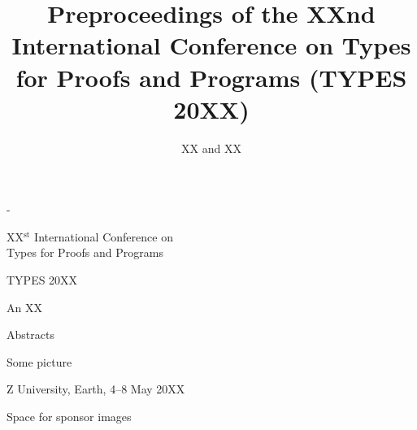 \documentclass[a4paper,extrafontsizes,oneside]{memoir}
\title{Preproceedings of the XXnd International Conference on Types for Proofs and Programs (TYPES 20XX)}
\author{XX and XX}
\begin{document}
\hypersetup{pageanchor=false}

{
\calccentering{\unitlength}
\begin{adjustwidth*}{\unitlength}{-\unitlength}

  \phantom{m}

  \vspace{1cm}

  \begin{center}
    {\LARGE XX$^{\text{st}}$ International Conference on \\ Types for Proofs and Programs \par}
  \end{center}

  \vspace{0.8cm}

  \begin{center}
    {\HUGE TYPES 20XX}
  \end{center}

  \vspace{0.8cm}

  \begin{center}
    {\LARGE An XX}
  \end{center}

  \vspace{1.2cm}

  \begin{center}
    {\Huge \noindent Abstracts}
  \end{center}

  \vspace{2cm}

  \begin{center}
    Some picture
  \end{center}

  \vspace{1.8cm}

  \begin{center}
    {\LARGE Z University, Earth, 4--8 May 20XX \par}
  \end{center}

  \vspace{2.5cm}

  Space for sponsor images

\end{adjustwidth*}
}

\clearpage

\begingroup
\footnotesize
\parindent 0pt
\parskip \baselineskip
\end{document}
